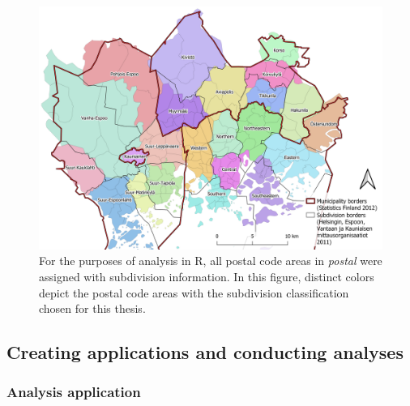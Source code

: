 \begin{figure}[H]%
    \includegraphics[width=\textwidth]{images/thesis_subdiv_place.png}
    \caption[Placing postal code areas in subdivisions]{For the purposes of analysis in R, all postal code areas in \textit{postal} were assigned with subdivision information. In this figure, distinct colors depict the postal code areas with the subdivision classification chosen for this thesis.}%
    \label{fig:subdiv_placement}%
\end{figure}

\newpage
\subsection{Creating applications and conducting analyses}
\subsubsection{Analysis application}
\justify

